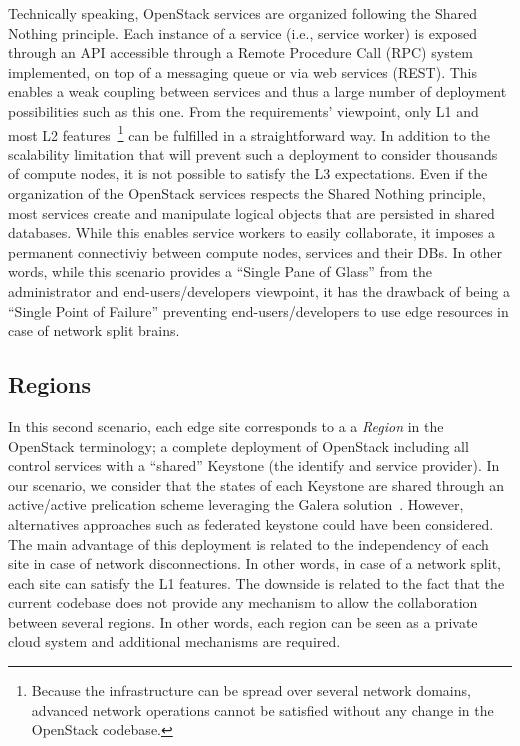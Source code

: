 %
Technically speaking, OpenStack services are organized following the
Shared Nothing principle. Each instance of a service (i.e., service
worker) is exposed through an API accessible through a Remote
Procedure Call (RPC) system implemented, on top of a messaging queue
or via web services (REST). This enables a weak coupling between
services and thus a large number of deployment possibilities such as
this one.
%
From the requirements' viewpoint, only L1
and most L2 features~\footnote{Because the infrastructure can
  be spread over several network domains, advanced network operations
  cannot be satisfied without any change in the OpenStack codebase.}
can be fulfilled in a straightforward way.  In addition to
the scalability limitation that will prevent such a deployment to 
consider thousands of compute nodes, it is not possible to satisfy the
L3 expectations.
%
Even if the organization of the OpenStack services respects the Shared
Nothing principle, most services create and manipulate logical objects
that are persisted in shared databases. While this enables service
workers to easily collaborate, it imposes a permanent connectiviy
between compute nodes, services and their DBs. In other words, while
this scenario provides a ``Single Pane of Glass'' from the
administrator and end-users/developers viewpoint, it has the drawback
of being a ``Single Point of Failure'' preventing end-users/developers
to use edge resources in case of network split brains.


\subsection{Regions}
In this second scenario, each edge site corresponds to a a
\emph{Region} in the OpenStack terminology; \ie a complete deployment
of OpenStack including all control services with a ``shared'' Keystone
(\ie the identify and service provider). In our scenario, we consider
that the states of each Keystone are shared through an active/active
prelication scheme leveraging the Galera solution~\cite{www:galera}.
However, alternatives approaches such as federated keystone could have
been considered.  The main advantage of this deployment is related to
the independency of each site in case of network disconnections.  In
other words, in case of a network split, each site can satisfy the L1
features.  The downside is related to the fact that the current
codebase does not provide any mechanism to allow the collaboration
between several regions. In other words, each region can be seen as a
private cloud system and additional mechanisms are required.


